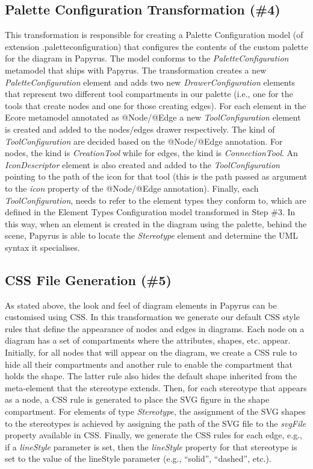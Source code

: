 \subsection{Palette Configuration Transformation (\#4)}
\label{sec:paletteGeneration}
This transformation is responsible for creating a Palette Configuration model (of extension .paletteconfiguration) that configures the contents of the custom palette for the diagram in Papyrus. 
The model conforms to the \textit{PaletteConfiguration} metamodel that ships with Papyrus.
The transformation creates a new \textit{PaletteConfiguration} element and adds two new \textit{DrawerConfiguration} elements that represent two different tool compartments in our palette (i.e., one for the tools that create nodes and one for those creating edges). 
For each element in the Ecore metamodel annotated as @Node/@Edge a new \textit{ToolConfiguration} element is created and added to the nodes/edges drawer respectively. 
The kind of \textit{ToolConfiguration} are decided based on the @Node/@Edge annotation. For nodes, the kind is \textit{CreationTool} while for edges, the kind is \textit{ConnectionTool}.
An \textit{IconDescriptor} element is also created and added to the \textit{ToolConfiguration} pointing to the path of the icon for that tool (this is the path passed as argument to the \textit{icon} property of the @Node/@Edge annotation).
Finally, each \textit{ToolConfiguration}, needs to refer to the element types they conform to, which are defined in the Element Types Configuration model transformed in Step \#3. 
In this way, when an element is created in the diagram using the palette, behind the scene, Papyrus is able to locate the \textit{Stereotype} element and determine the UML syntax it specialises.

\subsection{CSS File Generation (\#5)}
\label{sec:cssGeneration}
As stated above, the look and feel of diagram elements in Papyrus can be customised using CSS. 
In this transformation we generate our default CSS style rules that define the appearance of nodes and edges in diagrams. 
Each node on a diagram has a set of compartments where the attributes, shapes, etc. appear. 
Initially, for all nodes that will appear on the diagram, we create a CSS rule to hide all their compartments and another rule to enable the compartment that holds the shape. 
The latter rule also hides the default shape inherited from the meta-element that the stereotype extends. 
Then, for each stereotype that appears as a node, a CSS rule is generated to place the SVG figure in the shape compartment. 
For elements of type \textit{Stereotype}, the assignment of the SVG shapes to the stereotypes is achieved by assigning the path of the SVG file to the \textit{svgFile} property available in CSS. 
Finally, we generate the CSS rules for each edge, e.g., if a \emph{lineStyle} parameter is set, then the \textit{lineStyle} property for that stereotype is set to the value of the lineStyle parameter (e.g., ``solid'', ``dashed'', etc.).

